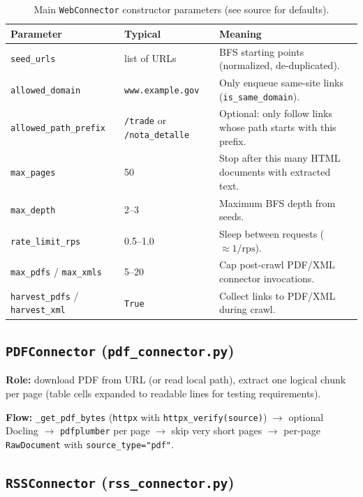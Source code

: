 \documentclass[11pt,a4paper]{article}
\begin{document}
\begin{table}[h]
\centering
\begin{tabular}{@{}llp{7.2cm}@{}}
\toprule
Parameter & Typical & Meaning \\
\midrule
\texttt{seed\_urls} & list of URLs & BFS starting points (normalized, de-duplicated). \\
\texttt{allowed\_domain} & \texttt{www.example.gov} & Only enqueue same-site links (\texttt{is\_same\_domain}). \\
\texttt{allowed\_path\_prefix} & \texttt{/trade} or \texttt{/nota\_detalle} & Optional: only follow links whose path starts with this prefix. \\
\texttt{max\_pages} & 50 & Stop after this many HTML documents with extracted text. \\
\texttt{max\_depth} & 2--3 & Maximum BFS depth from seeds. \\
\texttt{rate\_limit\_rps} & 0.5--1.0 & Sleep between requests ($\approx 1/\mathrm{rps}$). \\
\texttt{max\_pdfs} / \texttt{max\_xmls} & 5--20 & Cap post-crawl PDF/XML connector invocations. \\
\texttt{harvest\_pdfs} / \texttt{harvest\_xml} & \texttt{True} & Collect links to PDF/XML during crawl. \\
\bottomrule
\end{tabular}
\caption{Main \texttt{WebConnector} constructor parameters (see source for defaults).}
\end{table}

\subsection{\texttt{PDFConnector} (\texttt{pdf\_connector.py})}

\textbf{Role:} download PDF from URL (or read local path), extract one logical chunk per page (table cells expanded to readable lines for testing requirements).

\textbf{Flow:} \texttt{\_get\_pdf\_bytes} (\texttt{httpx} with \texttt{httpx\_verify(source)}) $\rightarrow$ optional Docling $\rightarrow$ \texttt{pdfplumber} per page $\rightarrow$ skip very short pages $\rightarrow$ per-page \texttt{RawDocument} with \texttt{source\_type="pdf"}.

\subsection{\texttt{RSSConnector} (\texttt{rss\_connector.py})}
\end{document}
